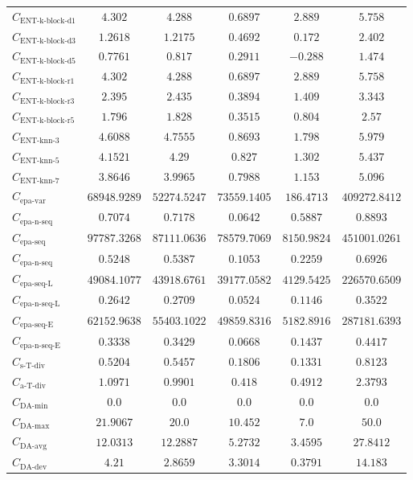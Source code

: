 \documentclass{standalone}
\newcommand{\daminname}{\text{DA-min}}
\newcommand{\damin}{C_{\daminname}}
\newcommand{\daavgname}{\text{DA-avg}}
\newcommand{\daavg}{C_{\daavgname}}
\newcommand{\damaxname}{\text{DA-max}}
\newcommand{\damax}{C_{\damaxname}}
\newcommand{\dadevname}{\text{DA-dev}}
\newcommand{\dadev}{C_{\dadevname}}
\newcommand{\simpletracedivname}{\text{s-T-div}}
\newcommand{\simpletracediv}{C_{\simpletracedivname}}
\newcommand{\advtracedivname}{\text{a-T-div}}
\newcommand{\advtracediv}{C_{\advtracedivname}}
\newcommand{\entkblockdonename}{\text{ENT-k-block-d1}}
\newcommand{\entkblockdone}{C_{\entkblockdonename}}
\newcommand{\entkblockdthreename}{\text{ENT-k-block-d3}}
\newcommand{\entkblockdthree}{C_{\entkblockdthreename}}
\newcommand{\entkblockdfivename}{\text{ENT-k-block-d5}}
\newcommand{\entkblockdfive}{C_{\entkblockdfivename}}
\newcommand{\entkblockronename}{\text{ENT-k-block-r1}}
\newcommand{\entkblockrone}{C_{\entkblockronename}}
\newcommand{\entkblockrthreename}{\text{ENT-k-block-r3}}
\newcommand{\entkblockrthree}{C_{\entkblockrthreename}}
\newcommand{\entkblockrfivename}{\text{ENT-k-block-r5}}
\newcommand{\entkblockrfive}{C_{\entkblockrfivename}}
\newcommand{\entknnthreename}{\text{ENT-knn-3}}
\newcommand{\entknnthree}{C_{\entknnthreename}}
\newcommand{\entknnfivename}{\text{ENT-knn-5}}
\newcommand{\entknnfive}{C_{\entknnfivename}}
\newcommand{\entknnsevenname}{\text{ENT-knn-7}}
\newcommand{\entknnseven}{C_{\entknnsevenname}}
\newcommand{\epavariantname}{\text{epa-var}}
\newcommand{\epavariant}{C_{\epavariantname}}
\newcommand{\epanormvariant}{C_{\epanormsequencename}}
\newcommand{\epasequencename}{\text{epa-seq}}
\newcommand{\epasequence}{C_{\epasequencename}}
\newcommand{\epanormsequencename}{\text{epa-n-seq}}
\newcommand{\epanormsequence}{C_{\epanormsequencename}}
\newcommand{\epasequencelname}{\text{epa-seq-L}}
\newcommand{\epasequencel}{C_{\epasequencelname}}
\newcommand{\epanormsequencelname}{\text{epa-n-seq-L}}
\newcommand{\epanormsequencel}{C_{\epanormsequencelname}}
\newcommand{\epasequenceename}{\text{epa-seq-E}}
\newcommand{\epasequencee}{C_{\epasequenceename}}
\newcommand{\epanormsequenceename}{\text{epa-n-seq-E}}
\newcommand{\epanormsequencee}{C_{\epanormsequenceename}}
\begin{document}
\begin{tabular}{lccccc}
$\entkblockdone$ & $4.302$ & $4.288$ & $0.6897$ & $2.889$ & $5.758$ \\ 
$\entkblockdthree$ & $1.2618$ & $1.2175$ & $0.4692$ & $0.172$ & $2.402$ \\ 
$\entkblockdfive$ & $0.7761$ & $0.817$ & $0.2911$ & $-0.288$ & $1.474$ \\ 
$\entkblockrone$ & $4.302$ & $4.288$ & $0.6897$ & $2.889$ & $5.758$ \\ 
$\entkblockrthree$ & $2.395$ & $2.435$ & $0.3894$ & $1.409$ & $3.343$ \\ 
$\entkblockrfive$ & $1.796$ & $1.828$ & $0.3515$ & $0.804$ & $2.57$ \\ 
$\entknnthree$ & $4.6088$ & $4.7555$ & $0.8693$ & $1.798$ & $5.979$ \\ 
$\entknnfive$ & $4.1521$ & $4.29$ & $0.827$ & $1.302$ & $5.437$ \\ 
$\entknnseven$ & $3.8646$ & $3.9965$ & $0.7988$ & $1.153$ & $5.096$ \\ 
$\epavariant$ & $68948.9289$ & $52274.5247$ & $73559.1405$ & $186.4713$ & $409272.8412$ \\ 
$\epanormvariant$ & $0.7074$ & $0.7178$ & $0.0642$ & $0.5887$ & $0.8893$ \\ 
$\epasequence$ & $97787.3268$ & $87111.0636$ & $78579.7069$ & $8150.9824$ & $451001.0261$ \\ 
$\epanormsequence$ & $0.5248$ & $0.5387$ & $0.1053$ & $0.2259$ & $0.6926$ \\ 
$\epasequencel$ & $49084.1077$ & $43918.6761$ & $39177.0582$ & $4129.5425$ & $226570.6509$ \\ 
$\epanormsequencel$ & $0.2642$ & $0.2709$ & $0.0524$ & $0.1146$ & $0.3522$ \\ 
$\epasequencee$ & $62152.9638$ & $55403.1022$ & $49859.8316$ & $5182.8916$ & $287181.6393$ \\ 
$\epanormsequencee$ & $0.3338$ & $0.3429$ & $0.0668$ & $0.1437$ & $0.4417$ \\ 
$\simpletracediv$ & $0.5204$ & $0.5457$ & $0.1806$ & $0.1331$ & $0.8123$ \\ 
$\advtracediv$ & $1.0971$ & $0.9901$ & $0.418$ & $0.4912$ & $2.3793$ \\ 
$\damin$ & $0.0$ & $0.0$ & $0.0$ & $0.0$ & $0.0$ \\ 
$\damax$ & $21.9067$ & $20.0$ & $10.452$ & $7.0$ & $50.0$ \\ 
$\daavg$ & $12.0313$ & $12.2887$ & $5.2732$ & $3.4595$ & $27.8412$ \\ 
$\dadev$ & $4.21$ & $2.8659$ & $3.3014$ & $0.3791$ & $14.183$ \\ 

\end{tabular}
\end{document}
